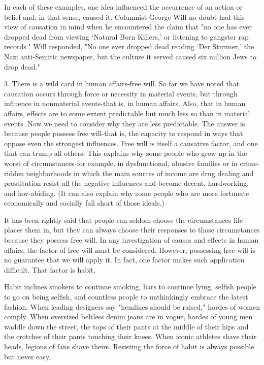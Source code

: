 \documentclass{book}
\begin{document}
In each of these examples, one idea influenced the occurrence of an action or belief and, in that sense, caused it. Columnist George Will no doubt had this view of causation in mind when he encountered the claim that "no one has ever dropped dead from viewing ‘Natural Born Killers,’ or listening to gangster rap records." Will responded, "No one ever dropped dead reading ‘Der Sturmer,’ the Nazi anti-Semitic newspaper, but the culture it served caused six million Jews to drop dead."

3. There is a wild card in human affairs-free will. So far we have noted that causation occurs through force or necessity in material events, but through influence in nonmaterial events-that is, in human affairs. Also, that in human affairs, effects are to some extent predictable but much less so than in material events. Now we need to consider why they are less predictable. The answer is because people possess free will-that is, the capacity to respond in ways that oppose even the strongest influences. Free will is itself a causative factor, and one that can trump all others. This explains why some people who grow up in the worst of circumstances-for example, in dysfunctional, abusive families or in crime-ridden neighborhoods in which the main sources of income are drug dealing and prostitution-resist all the negative influences and become decent, hardworking, and law-abiding. (It can also explain why some people who are more fortunate economically and socially fall short of those ideals.)

It has been rightly said that people can seldom choose the circumstances life places them in, but they can always choose their responses to those circumstances because they possess free will. In any investigation of causes and effects in human affairs, the factor of free will must be considered. However, possessing free will is no guarantee that we will apply it. In fact, one factor makes such application difficult. That factor is habit.

Habit inclines smokers to continue smoking, liars to continue lying, selfish people to go on being selfish, and countless people to unthinkingly embrace the latest fashion. When leading designers say "hemlines should be raised," hordes of women comply. When oversized beltless denim jeans are in vogue, hordes of young men waddle down the street, the tops of their pants at the middle of their hips and the crotches of their pants touching their knees. When iconic athletes shave their heads, legions of fans shave theirs. Resisting the force of habit is always possible but never easy.
\end{document}
